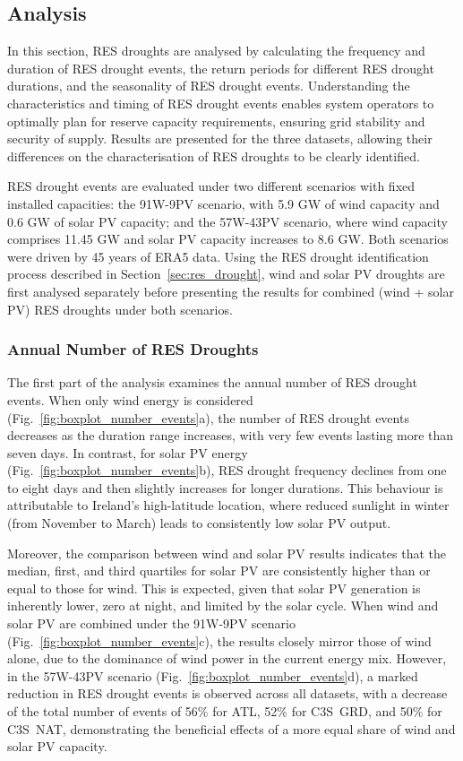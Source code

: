 \documentclass[preprint, 12pt]{elsarticle}
\begin{document}
\subsection{Analysis}
\label{sec:analysis}

In this section, RES droughts are analysed by calculating the frequency and duration of RES drought events, the return periods for different RES drought durations, and the seasonality of RES drought events. Understanding the characteristics and timing of RES drought events enables system operators to optimally plan for reserve capacity requirements, ensuring grid stability and security of supply. Results are presented for the three datasets, allowing their differences on the characterisation of RES droughts to be clearly identified.

RES drought events are evaluated under two different scenarios with fixed installed capacities: the 91W-9PV scenario, with 5.9 GW of wind capacity and 0.6 GW of solar PV capacity; and the 57W-43PV scenario, where wind capacity comprises 11.45 GW and solar PV capacity increases to 8.6 GW. Both scenarios were driven by 45 years of ERA5 data. Using the RES drought identification process described in Section~\ref{sec:res_drought}, wind and solar PV droughts are first analysed separately before presenting the results for combined (wind + solar PV) RES droughts under both scenarios.

\subsubsection{Annual Number of RES Droughts}

The first part of the analysis examines the annual number of RES drought events. When only wind energy is considered (Fig.~\ref{fig:boxplot_number_events}a), the number of RES drought events decreases as the duration range increases, with very few events lasting more than seven days. In contrast, for solar PV energy (Fig.~\ref{fig:boxplot_number_events}b), RES drought frequency declines from one to eight days and then slightly increases for longer durations. This behaviour is attributable to Ireland's high-latitude location, where reduced sunlight in winter (from November to March) leads to consistently low solar PV output.

Moreover, the comparison between wind and solar PV results indicates that the median, first, and third quartiles for solar PV are consistently higher than or equal to those for wind. This is expected, given that solar PV generation is inherently lower, zero at night, and limited by the solar cycle. When wind and solar PV are combined under the 91W-9PV scenario (Fig.~\ref{fig:boxplot_number_events}c), the results closely mirror those of wind alone, due to the dominance of wind power in the current energy mix. However, in the 57W-43PV scenario (Fig.~\ref{fig:boxplot_number_events}d), a marked reduction in RES drought events is observed across all datasets, with a decrease of the total number of events of 56\% for ATL, 52\% for C3S~GRD, and 50\% for C3S~NAT, demonstrating the beneficial effects of a more equal share of wind and solar PV capacity.
\end{document}
